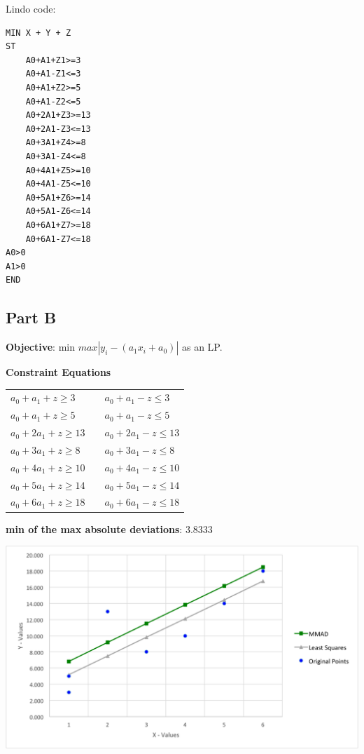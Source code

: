 \documentclass[11pt,letterpaper]{article}
\begin{document}
Lindo code:\vspace{8pt}

\begin{verbatim}
MIN X + Y + Z
ST
    A0+A1+Z1>=3
    A0+A1-Z1<=3
    A0+A1+Z2>=5
    A0+A1-Z2<=5
    A0+2A1+Z3>=13
    A0+2A1-Z3<=13
    A0+3A1+Z4>=8
    A0+3A1-Z4<=8
    A0+4A1+Z5>=10
    A0+4A1-Z5<=10
    A0+5A1+Z6>=14
    A0+5A1-Z6<=14
    A0+6A1+Z7>=18
    A0+6A1-Z7<=18
A0>0
A1>0
END
\end{verbatim}

\subsection*{Part B}
\textbf{Objective}: min $max |y_i -  (a_1x_i + a_0)|$ as an LP.\vspace{8pt}

\textbf{Constraint Equations}

\begin{tabular}{l l l}
$a_0+a_1+z\geq3$		&  & $a_0+a_1-z\leq3$\\
$a_0+a_1+z\geq5$ 		& & $a_0+a_1-z\leq5$\\
$a_0+2a_1+z\geq13$	& & $a_0+2a_1-z\leq13$\\
$a_0+3a_1+z\geq8$		& & $a_0+3a_1-z\leq8$\\
$a_0+4a_1+z\geq10$	& & $a_0+4a_1-z\leq10$\\
$a_0+5a_1+z\geq14$	& & $a_0+5a_1-z\leq14$\\
$a_0+6a_1+z\geq18$	& & $a_0+6a_1-z\leq18$\\
\end{tabular}\vspace{8pt}


\textbf{min of the max absolute deviations}: 3.8333\vspace{8pt}

\centerline{\includegraphics[width=7in]{mmad.png}}
\end{document}
